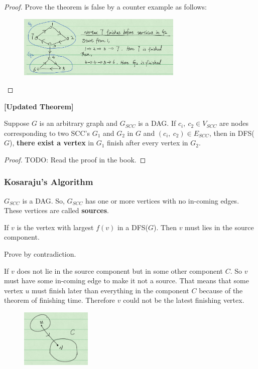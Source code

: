 \begin{proof}
 Prove the theorem is false by a counter example as follows:
\begin{figure}[H]
\centering
\includegraphics[width=0.7\textwidth]{scc-finish-time.png}
\end{figure}
\end{proof}

\begin{theorem}\textbf{[Updated Theorem]}

Suppose $G$ is an arbitrary graph and $G_{SCC}$ is a DAG. If $c_i, ~c_2 \in V_{SCC}$ are nodes corresponding to two SCC's $G_1$ and $G_2$ in $G$ and $(c_i, ~c_2) \in E_{SCC}$, then in DFS($G$), \textbf{there exist a vertex} in $G_1$ finish after every vertex in $G_2$. 
\end{theorem}

\begin{proof}
 TODO: Read the proof in the book.
\end{proof}

\subsubsection{Kosaraju's Algorithm}
\begin{definition}
$G_{SCC}$ is a DAG. So, $G_{SCC}$ has one or more vertices with no in-coming 
edges. These vertices are called \textbf{sources}.
\end{definition}

\begin{claim}{}
If $v$ is the vertex with largest $f(v)$ in a DFS($G$). Then $v$ must lies in 
the source component. 
\end{claim}

\begin{claimproof}{}
Prove by contradiction.

If $v$ does not lie in the source component but in some other component $C$. So 
$v$ must have some in-coming edge to make it not a source. That means that 
some vertex $u$ must finish later than everything in the component $C$ because 
of the theorem of finishing time. Therefore $v$ could not be the latest 
finishing vertex.
\begin{figure}[H]
\centering
\includegraphics[width=0.3\textwidth]{source-finish-time.png}
\end{figure}
\end{claimproof}


